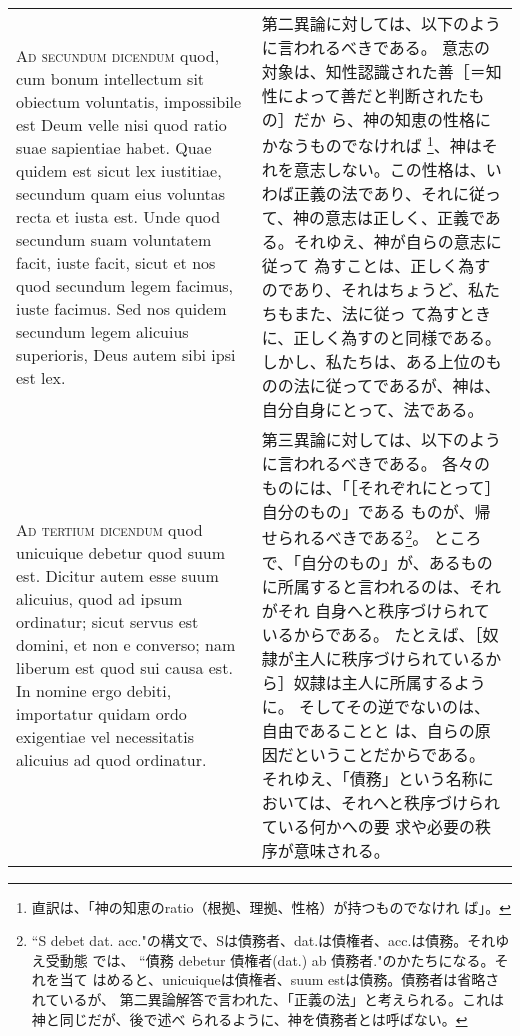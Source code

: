 \documentclass[10pt]{jsarticle} %
\begin{document}
{\begin{longtable}{p{21em}p{21em}}
\\


{\scshape Ad secundum dicendum} quod, cum bonum
intellectum sit obiectum voluntatis, impossibile est Deum velle nisi
quod ratio suae sapientiae habet. Quae quidem est sicut lex iustitiae,
secundum quam eius voluntas recta et iusta est. Unde quod secundum suam
voluntatem facit, iuste facit, sicut et nos quod secundum legem facimus,
iuste facimus. Sed nos quidem secundum legem alicuius superioris, Deus
autem sibi ipsi est lex.

&


第二異論に対しては、以下のように言われるべきである。
意志の対象は、知性認識された善［＝知性によって善だと判断されたもの］だか
 ら、神の知恵の性格にかなうものでなければ
 \footnote{直訳は、「神の知恵のratio（根拠、理拠、性格）が持つものでなけれ
 ば」。}、神はそれを意志しない。この性格は、いわば正義の法であり、それに従っ
 て、神の意志は正しく、正義である。それゆえ、神が自らの意志に従って
 為すことは、正しく為すのであり、それはちょうど、私たちもまた、法に従っ
 て為すときに、正しく為すのと同様である。しかし、私たちは、ある上位のも
 のの法に従ってであるが、神は、自分自身にとって、法である。

\\


{\scshape Ad tertium dicendum} quod unicuique debetur
quod suum est. Dicitur autem esse suum alicuius, quod ad ipsum
ordinatur; sicut servus est domini, et non e converso; nam liberum est
quod sui causa est. In nomine ergo debiti, importatur quidam ordo
exigentiae vel necessitatis alicuius ad quod ordinatur. 

&

第三異論に対しては、以下のように言われるべきである。
各々のものには、「［それぞれにとって］自分のもの」である
 ものが、帰せられるべきである\footnote{ ``S debet
 dat. acc."の構文で、Sは債務者、dat.は債権者、acc.は債務。それゆえ受動態
 では、 ``債務 debetur 債権者(dat.) ab 債務者."のかたちになる。それを当て
 はめると、unicuiqueは債権者、suum estは債務。債務者は省略されているが、
 第二異論解答で言われた、「正義の法」と考えられる。これは神と同じだが、後で述べ
 られるように、神を債務者とは呼ばない。}。
ところで、「自分のもの」が、あるものに所属すると言われるのは、それがそれ
 自身へと秩序づけられているからである。
たとえば、［奴隷が主人に秩序づけられているから］奴隷は主人に所属するよう
 に。
そしてその逆でないのは、自由であることと
は、自らの原因だということだからである。
それゆえ、「債務」という名称においては、それへと秩序づけられている何かへの要
求や必要の秩序が意味される。




\end{longtable}}
\end{document}
